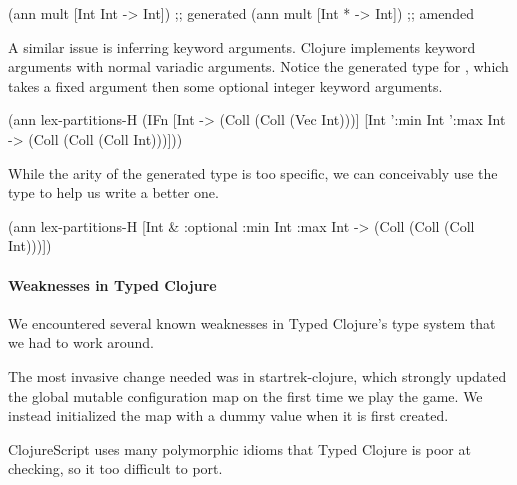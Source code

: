 \begin{cljlisting}
(ann mult [Int Int -> Int]) ;; generated
(ann mult [Int * -> Int])   ;; amended
\end{cljlisting}

A similar issue is inferring keyword arguments. Clojure implements
keyword arguments with normal variadic arguments. Notice
the generated type for ,
which takes a fixed argument then some optional integer keyword
arguments. 

\begin{cljlisting}
(ann lex-partitions-H
  (IFn [Int -> (Coll (Coll (Vec Int)))]
       [Int ':min Int ':max Int 
        -> (Coll (Coll (Coll Int)))]))
\end{cljlisting}

While the arity of the generated type is too specific,
we can conceivably use the type to help us write a better one.

\begin{cljlisting}
(ann lex-partitions-H
  [Int & :optional {:min Int :max Int}
   -> (Coll (Coll (Coll Int)))])
\end{cljlisting}

\paragraph{Weaknesses in Typed Clojure}

We encountered several known weaknesses in Typed Clojure's type system
that we had to work around.

The most invasive change needed was in startrek-clojure, which
strongly updated the global mutable configuration map on the first
time we play the game. We instead initialized the map with a dummy
value when it is first created.

ClojureScript uses many polymorphic idioms that Typed Clojure is
poor at checking, so it too difficult to port.



